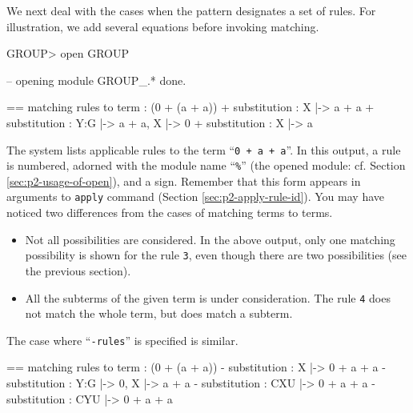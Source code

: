\documentclass[a4paper]{memoir}
\begin{document}
We next deal with the cases when the pattern designates a set of rules.
For illustration, we add several equations before invoking matching.
\begin{vvtm}
\begin{ccode}
  GROUP> open GROUP

  -- opening module GROUP_.* done.





  == matching rules to term : (0 + (a + a))
  +%
   substitution : { X |-> a + a }
  +%
   substitution : { Y:G |-> a + a, X |-> 0 }
  +%
   substitution : { X |-> a }

\end{ccode}
\end{vvtm}
The system lists applicable rules to the term ``\verb|0 + a + a|''.
In this output, a rule is numbered, adorned with the module name
``\verb|%|'' (the opened module: cf. Section \ref{sec:p2-usage-of-open}),
and a sign. Remember that this form appears in arguments to \verb|apply|
command (Section \ref{sec:p2-apply-rule-id}). You may have noticed
two differences from the cases of matching terms to terms.
\begin{itemize}
\item Not all possibilities are considered. In the above output,
  only one matching possibility is shown for the rule \verb|3|, even though
  there are two possibilities (see the previous section).
\item All the subterms of the given term is under consideration.
  The rule \verb|4| does not match the whole term, but does match
  a subterm.
\end{itemize}
The case where ``\verb|-rules|'' is specified is similar.
\begin{vvtm}
\begin{ccode}
  == matching rules to term : (0 + (a + a))
  -%
   substitution : { X |-> 0 + a + a }
  -%
   substitution : { Y:G |-> 0, X |-> a + a }
  -%
   substitution : { CXU |-> 0 + a + a }
  -%
   substitution : { CYU |-> 0 + a + a }

\end{ccode}
\end{vvtm}
\end{document}
